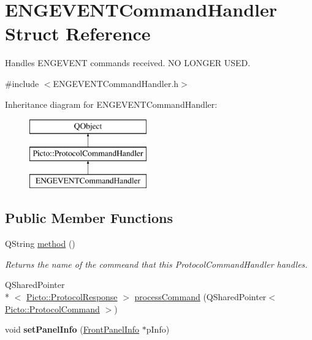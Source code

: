 \hypertarget{struct_e_n_g_e_v_e_n_t_command_handler}{\section{E\-N\-G\-E\-V\-E\-N\-T\-Command\-Handler Struct Reference}
\label{struct_e_n_g_e_v_e_n_t_command_handler}
}


Handles E\-N\-G\-E\-V\-E\-N\-T commands received. N\-O L\-O\-N\-G\-E\-R U\-S\-E\-D.  




{\ttfamily \#include $<$E\-N\-G\-E\-V\-E\-N\-T\-Command\-Handler.\-h$>$}

Inheritance diagram for E\-N\-G\-E\-V\-E\-N\-T\-Command\-Handler\-:\begin{figure}[H]
\begin{center}
\leavevmode
\includegraphics[height=3.000000cm]{struct_e_n_g_e_v_e_n_t_command_handler}
\end{center}
\end{figure}
\subsection*{Public Member Functions}
\begin{DoxyCompactItemize}
\item 
\hypertarget{struct_e_n_g_e_v_e_n_t_command_handler_a8b268d0b19b7529dc69d7cb47843d1ae}{Q\-String \hyperlink{struct_e_n_g_e_v_e_n_t_command_handler_a8b268d0b19b7529dc69d7cb47843d1ae}{method} ()}\label{struct_e_n_g_e_v_e_n_t_command_handler_a8b268d0b19b7529dc69d7cb47843d1ae}

\begin{DoxyCompactList}\small\item\em Returns the name of the commeand that this Protocol\-Command\-Handler handles. \end{DoxyCompactList}\item 
Q\-Shared\-Pointer\\*
$<$ \hyperlink{struct_picto_1_1_protocol_response}{Picto\-::\-Protocol\-Response} $>$ \hyperlink{struct_e_n_g_e_v_e_n_t_command_handler_a02efe2d46dbc2354ed79d95dca82848d}{process\-Command} (Q\-Shared\-Pointer$<$ \hyperlink{struct_picto_1_1_protocol_command}{Picto\-::\-Protocol\-Command} $>$)
\item 
\hypertarget{struct_e_n_g_e_v_e_n_t_command_handler_a15adc2c363f1115acdacffe2ca5ce633}{void {\bfseries set\-Panel\-Info} (\hyperlink{class_front_panel_info}{Front\-Panel\-Info} $\ast$p\-Info)}\label{struct_e_n_g_e_v_e_n_t_command_handler_a15adc2c363f1115acdacffe2ca5ce633}

\end{DoxyCompactItemize}


